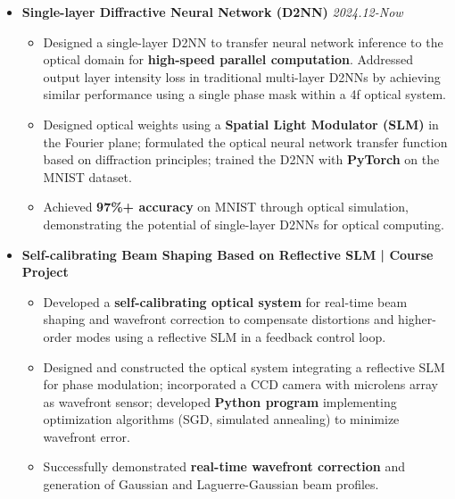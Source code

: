 \documentclass[10pt, a4paper]{article}
\begin{document}
\begin{itemize}[leftmargin=*, label={}]

    \item
    \textbf{Single-layer Diffractive Neural Network (D2NN)} \hfill \textit{2024.12-Now}
    \begin{itemize}[leftmargin=1.5em]
        \item Designed a single-layer D2NN to transfer neural network inference to the optical domain for \textbf{high-speed parallel computation}. Addressed output layer intensity loss in traditional multi-layer D2NNs by achieving similar performance using a single phase mask within a 4f optical system.
        \item Designed optical weights using a \textbf{Spatial Light Modulator (SLM)} in the Fourier plane; formulated the optical neural network transfer function based on diffraction principles; trained the D2NN with \textbf{PyTorch} on the MNIST dataset.
        \item Achieved \textbf{97\%+ accuracy} on MNIST through optical simulation, demonstrating the potential of single-layer D2NNs for optical computing.
    \end{itemize}
    \vspace{0.2em}

    \item
    \textbf{Self-calibrating Beam Shaping Based on Reflective SLM | Course Project}
    \begin{itemize}[leftmargin=1.5em]
        \item Developed a \textbf{self-calibrating optical system} for real-time beam shaping and wavefront correction to compensate distortions and higher-order modes using a reflective SLM in a feedback control loop.
        \item Designed and constructed the optical system integrating a reflective SLM for phase modulation; incorporated a CCD camera with microlens array as wavefront sensor; developed \textbf{Python program} implementing optimization algorithms (SGD, simulated annealing) to minimize wavefront error.
        \item Successfully demonstrated \textbf{real-time wavefront correction} and generation of Gaussian and Laguerre-Gaussian beam profiles.
    \end{itemize}
    \vspace{0.2em}


\end{itemize}
\end{document}

